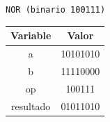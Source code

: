 \documentclass[letterpaper]{sae}
\begin{document}
\begin{figure}[H] %
\label{fig:test5}
\end{figure}

\verb+NOR (binario 100111)+\\

\begin{center}
	\begin{tabular}{|c|c|}
		\hline 
		Variable & Valor\tabularnewline
		\hline 
		\hline 
		a & 10101010\tabularnewline
		\hline 
		b & 11110000\tabularnewline
		\hline 
		op & 100111\tabularnewline
		\hline 
		resultado & 01011010\tabularnewline
		\hline 
	\end{tabular}
\end{center}
\end{document}

